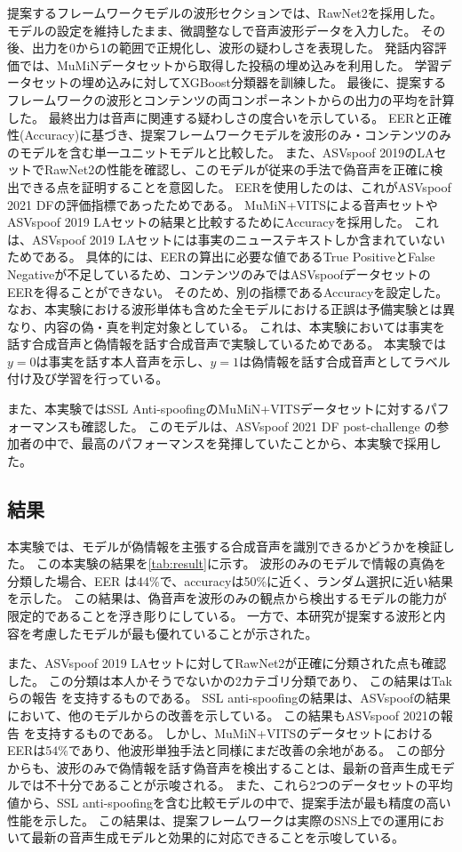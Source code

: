 提案するフレームワークモデルの波形セクションでは、RawNet2を採用した。
モデルの設定を維持したまま、微調整なしで音声波形データを入力した。
その後、出力を0から1の範囲で正規化し、波形の疑わしさを表現した。
発話内容評価では、MuMiNデータセットから取得した投稿の埋め込みを利用した。
学習データセットの埋め込みに対してXGBoost分類器を訓練した。
最後に、提案するフレームワークの波形とコンテンツの両コンポーネントからの出力の平均を計算した。
最終出力は音声に関連する疑わしさの度合いを示している。
EERと正確性(Accuracy)に基づき、提案フレームワークモデルを波形のみ・コンテンツのみのモデルを含む単一ユニットモデルと比較した。 
また、ASVspoof 2019のLAセットでRawNet2の性能を確認し、このモデルが従来の手法で偽音声を正確に検出できる点を証明することを意図した。
EERを使用したのは、これがASVspoof 2021 DFの評価指標であったためである。
MuMiN+VITSによる音声セットやASVspoof 2019 LAセットの結果と比較するためにAccuracyを採用した。
これは、ASVspoof 2019 LAセットには事実のニューステキストしか含まれていないためである。
具体的には、EERの算出に必要な値であるTrue PositiveとFalse Negativeが不足しているため、コンテンツのみではASVspoofデータセットのEERを得ることができない。
そのため、別の指標であるAccuracyを設定した。
なお、本実験における波形単体も含めた全モデルにおける正誤は予備実験とは異なり、内容の偽・真を判定対象としている。
これは、本実験においては事実を話す合成音声と偽情報を話す合成音声で実験しているためである。
本実験では$y=0$は事実を話す本人音声を示し、$y=1$は偽情報を話す合成音声としてラベル付け及び学習を行っている。

また、本実験ではSSL Anti-spoofingのMuMiN+VITSデータセットに対するパフォーマンスも確認した。
このモデルは、ASVspoof 2021 DF post-challenge \cite{10155166}の参加者の中で、最高のパフォーマンスを発揮していたことから、本実験で採用した。

\subsection{結果}\label{sec:cnt_res}
本実験では、モデルが偽情報を主張する合成音声を識別できるかどうかを検証した。
この本実験の結果を\ref{tab:result}に示す。
波形のみのモデルで情報の真偽を分類した場合、EER は44\%で、accuracyは50\%に近く、ランダム選択に近い結果を示した。
この結果は、偽音声を波形のみの観点から検出するモデルの能力が限定的であることを浮き彫りにしている。
一方で、本研究が提案する波形と内容を考慮したモデルが最も優れていることが示された。

また、ASVspoof 2019 LAセットに対してRawNet2が正確に分類された点も確認した。
この分類は本人かそうでないかの2カテゴリ分類であり、
この結果はTakらの報告 \cite{9414234}を支持するものである。
SSL anti-spoofingの結果は、ASVspoofの結果において、他のモデルからの改善を示している。
この結果もASVspoof 2021の報告 \cite{10155166}を支持するものである。
しかし、MuMiN+VITSのデータセットにおけるEERは54\%であり、他波形単独手法と同様にまだ改善の余地がある。
この部分からも、波形のみで偽情報を話す偽音声を検出することは、最新の音声生成モデルでは不十分であることが示唆される。
また、これら2つのデータセットの平均値から、SSL anti-spoofingを含む比較モデルの中で、提案手法が最も精度の高い性能を示した。
この結果は、提案フレームワークは実際のSNS上での運用において最新の音声生成モデルと効果的に対応できることを示唆している。

